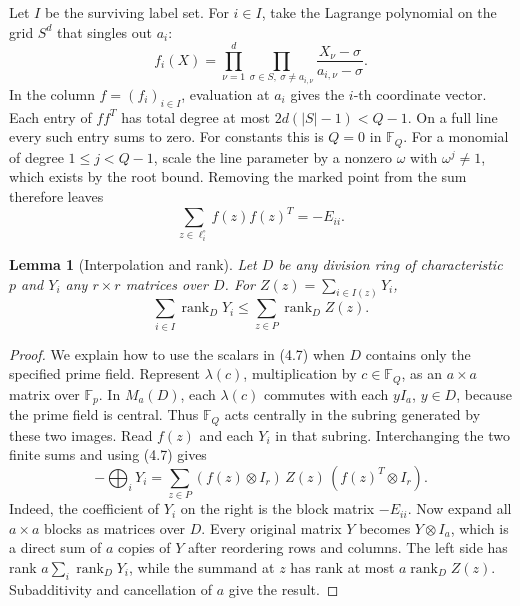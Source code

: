 \documentclass[11pt,a4paper]{article}
\newtheorem{lemma}[theorem]{Lemma}
\numberwithin{equation}{section}
\begin{document}
Let \(I\) be the surviving label set. For \(i\in I\), take the Lagrange polynomial on the grid \(S^d\) that singles out \(a_i\):
\[
 f_i(X)=\prod_{\nu=1}^d\prod_{\sigma\in S,\ \sigma\ne a_{i,\nu}}
 \frac{X_\nu-\sigma}{a_{i,\nu}-\sigma}.
\]
In the column \(f=(f_i)_{i\in I}\), evaluation at \(a_i\) gives the \(i\)-th coordinate vector. Each entry of \(ff^T\) has total degree at most \(2d(|S|-1)<Q-1\). On a full line every such entry sums to zero. For constants this is \(Q=0\) in \(\mathbb F_Q\). For a monomial of degree \(1\le j<Q-1\), scale the line parameter by a nonzero \(\omega\) with \(\omega^j\ne1\), which exists by the root bound. Removing the marked point from the sum therefore leaves
\begin{equation}
 \sum_{z\in\ell_i^\circ} f(z)f(z)^T=-E_{ii}.
\end{equation}

\begin{lemma}[Interpolation and rank]
Let \(D\) be any division ring of characteristic \(p\) and \(Y_i\) any \(r\times r\) matrices over \(D\). For \(Z(z)=\sum_{i\in I(z)}Y_i\),
\begin{equation}
 \sum_{i\in I}\operatorname{rank}_D Y_i\le\sum_{z\in P}\operatorname{rank}_D Z(z).
\end{equation}
\end{lemma}

\begin{proof}
We explain how to use the scalars in (4.7) when \(D\) contains only the specified prime field. Represent \(\lambda(c)\), multiplication by \(c\in\mathbb F_Q\), as an \(a\times a\) matrix over \(\mathbb F_p\). In \(M_a(D)\), each \(\lambda(c)\) commutes with each \(yI_a\), \(y\in D\), because the prime field is central. Thus \(\mathbb F_Q\) acts centrally in the subring generated by these two images. Read \(f(z)\) and each \(Y_i\) in that subring. Interchanging the two finite sums and using (4.7) gives
\begin{equation}
 -\bigoplus_iY_i=\sum_{z\in P}(f(z)\otimes I_r)\,Z(z)\,(f(z)^T\otimes I_r).
\end{equation}
Indeed, the coefficient of \(Y_i\) on the right is the block matrix \(-E_{ii}\). Now expand all \(a\times a\) blocks as matrices over \(D\). Every original matrix \(Y\) becomes \(Y\otimes I_a\), which is a direct sum of \(a\) copies of \(Y\) after reordering rows and columns. The left side has rank \(a\sum_i\operatorname{rank}_D Y_i\), while the summand at \(z\) has rank at most \(a\operatorname{rank}_D Z(z)\). Subadditivity and cancellation of \(a\) give the result.
\end{proof}
\end{document}
